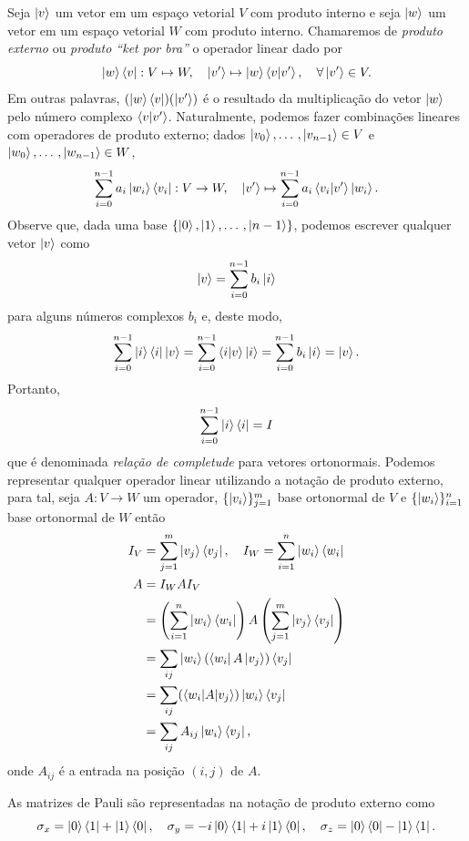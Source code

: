 	Seja $\ket{v}$ um vetor em um espaço vetorial $V$ com produto interno e seja $\ket{w}$ um vetor em um espaço vetorial $W$ com produto interno. Chamaremos de \emph{produto externo} ou \emph{produto ``ket por bra''} o operador linear dado por
\begin{equation}
	\ket{w}\bra{v}: V\mapsto W, \quad \ket{v'}\mapsto \ket{w}\braket{v|v'},  \quad \forall\ket{v'} \in V.
\end{equation}
Em outras palavras, $(\ket{w}\bra{v})(\ket{v'})$ é o resultado da multiplicação do vetor $\ket{w}$ pelo número complexo $\braket{v|v'}$. Naturalmente, podemos fazer combinações lineares com operadores de produto externo; dados $\ket{v_0}, \dotso, \ket{v_{n-1}}\in V$ e $\ket{w_0}, \dotso, \ket{w_{n-1}}\in W$,
\begin{equation*}
	\sum_{i=0}^{n-1} a_i \ket{w_i}\bra{v_i}: V \to W,\quad \ket{v'} \mapsto \sum_{i=0}^{n-1} a_i \braket{v_i|v'} \ket{w_i}.
\end{equation*}
Observe que, dada uma base $\{\ket{0}, \ket{1}, \dotso, \ket{n-1}\}$, podemos escrever qualquer vetor $\ket{v}$ como
$$
\ket{v} = \sum_{i=0}^{n-1} b_i \ket{i}
$$
para alguns números complexos $b_i$ e, deste modo,
$$
\sum_{i=0}^{n-1} \ket{i}\bra{i}\ket{v} = \sum_{i=0}^{n-1}\braket{i|v}\ket{i} = \sum_{i=0}^{n-1} b_i\ket{i} = \ket{v}.
$$
Portanto,
%
\begin{equation}
	\sum_{i=0}^{n-1} \ket{i}\bra{i} = I	
\end{equation}
que é denominada \emph{relação de completude} para vetores ortonormais. Podemos representar qualquer operador linear utilizando a notação de produto externo, para tal, seja $A: V\to W$ um operador, $\{\ket{v_i}\}_{j=1}^m$ base ortonormal de $V$ e $\{\ket{w_i}\}_{i=1}^n$ base ortonormal de $W$ então
\begin{align}
	I_V &= \sum_{j=1}^m\ket{v_j}\bra{v_j}, \quad I_W = \sum_{i=1}^n\ket{w_i}\bra{w_i} \\
	A &= I_WAI_V \\
	&=  \left ( \sum_{i=1}^n\ket{w_i}\bra{w_i} \right ) A \left (\sum_{j=1}^m\ket{v_j}\bra{v_j} \right ) \\
	&= \sum_{ij} \ket{w_i}(\bra{w_i}A\ket{v_j})\bra{v_j} \\
	&= \sum_{ij}(\braket{w_i|A|v_j})\ket{w_i}\bra{v_j} \\
	&= \sum_{ij}A_{ij}\ket{w_i}\bra{v_j},
\end{align}
onde $A_{ij}$ é a entrada na posição $(i,j)$ de $A$.

\begin{example}
	As matrizes de Pauli são representadas na notação de produto externo como
	$$
		\sigma_x = \ket{0}\bra{1} + \ket{1}\bra{0}, \quad
		\sigma_y = -i\ket{0}\bra{1} + i\ket{1}\bra{0}, \quad
		\sigma_z = \ket{0}\bra{0} - \ket{1}\bra{1}.
	$$
\end{example}

